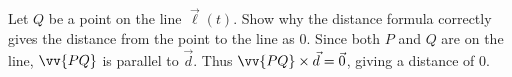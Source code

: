 {Let $Q$ be a point on the line $\vec \ell(t)$. Show why the distance formula correctly gives the distance from the point to the line as $0$.
}
{Since both $P$ and $Q$ are on the line, $\vv{PQ}$ is parallel to $\vec d$. Thus $\vv{PQ}\times \vec d = \vec 0$, giving a distance of $0$.
}

